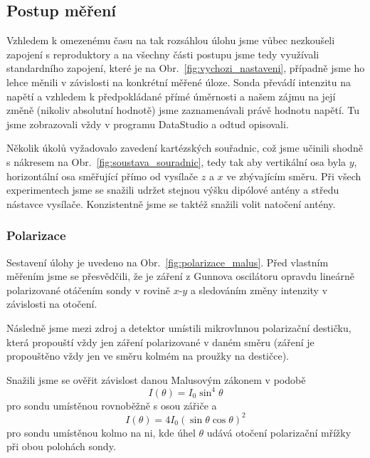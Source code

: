 \documentclass[english]{article}
\begin{document}
	\subsection{Postup měření}
					Vzhledem k omezenému času na tak rozsáhlou úlohu jsme vůbec nezkoušeli zapojení s reproduktory a na všechny části postupu jsme tedy využívali standardního zapojení, které je na Obr.~\ref{fig:vychozi_nastaveni}, případně jsme ho lehce měnili v závislosti na konkrétní měřené úloze. Sonda převádí intenzitu na napětí a vzhledem k předpokládané přímé úměrnosti a našem zájmu na její změně (nikoliv absolutní hodnotě) jsme zaznamenávali právě hodnotu napětí. Tu jsme zobrazovali vždy v programu DataStudio a odtud opisovali. 
					
					Několik úkolů vyžadovalo zavedení kartézských souřadnic, což jsme učinili shodně s nákresem na Obr.~\ref{fig:soustava_souradnic}, tedy tak aby vertikální osa byla $y$, horizontální osa směřující přímo od vysílače $z$ a $x$ ve zbývajícím směru. Při všech experimentech jsme se snažili udržet stejnou výšku dipólové antény a středu nástavce vysílače. Konzistentně jsme se taktéž snažili volit natočení antény.
								
			\subsubsection{Polarizace}
					Sestavení úlohy je uvedeno na Obr.~\ref{fig:polarizace_malus}. Před vlastním měřením jsme se přesvědčili, že je záření z Gunnova oscilátoru opravdu lineárně polarizované otáčením sondy v rovině $x$-$y$ a sledováním změny intenzity v závislosti na otočení. 
					
					Následně jsme mezi zdroj a detektor umístili mikrovlnnou polarizační destičku, která propouští vždy jen záření polarizované v daném směru (záření je propouštěno vždy jen ve směru kolmém na proužky na destičce). 
								
					Snažili jsme se ověřit závislost danou Malusovým zákonem v podobě 
					\begin{equation}
					I(\theta) = I_0 \sin^4 \theta
					\label{eq:malus_vert}
					\end{equation}
					pro sondu umístěnou rovnoběžně s osou zářiče a
					\begin{equation}
					I(\theta) = 4 I_0 ( \sin \theta \cos \theta )^2
					\label{eq:malus_hori}
					\end{equation}
					pro sondu umístěnou kolmo na ni, kde úhel $\theta$ udává otočení polarizační mřížky při obou polohách sondy.
					
\end{document}
